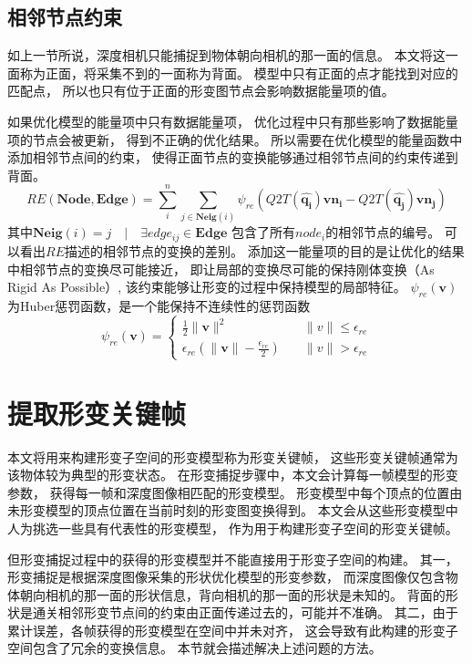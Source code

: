 \subsection{相邻节点约束}
如上一节所说，深度相机只能捕捉到物体朝向相机的那一面的信息。
本文将这一面称为正面，将采集不到的一面称为背面。
模型中只有正面的点才能找到对应的匹配点，
所以也只有位于正面的形变图节点会影响数据能量项的值。

如果优化模型的能量项中只有数据能量项，
优化过程中只有那些影响了数据能量项的节点会被更新，
得到不正确的优化结果。
所以需要在优化模型的能量函数中添加相邻节点间的约束，
使得正面节点的变换能够通过相邻节点间的约束传递到背面。
\begin{equation}
    RE(\bm{Node},\bm{Edge})=
    \sum_{i}^{n}
    \sum_{j \in \bm{Neig}(i)}
    \psi_{re}(
            Q2T(
                \hat{\bm{q_i}}
            )
            \bm{vn_i}
            -
            Q2T(
                \hat{\bm{q_j}}
            )
            \bm{vn_j}
        )
\end{equation}
其中$\bm{Neig}(i)={j \quad | \quad \exists edge_{ij} \in \bm{Edge}}$
包含了所有$node_i$的相邻节点的编号。
可以看出$RE$描述的相邻节点的变换的差别。
添加这一能量项的目的是让优化的结果中相邻节点的变换尽可能接近，
即让局部的变换尽可能的保持刚体变换（As Rigid As Possible）,
该约束能够让形变的过程中保持模型的局部特征。
$\psi_{re}(\bm{v})$为Huber惩罚函数，是一个能保持不连续性的惩罚函数
\begin{equation}
    \psi_{re}(\bm{v}) = 
    \begin{cases}
        \frac{1}{2}\|\bm{v}\|^2
        &\quad \|v\| \leq \epsilon_{re}\\
        \epsilon_{re}(\|\bm{v}\|-\frac{\epsilon_{re}}{2})
        &\quad \|v\| > \epsilon_{re}
    \end{cases}
\end{equation}
\section{提取形变关键帧}
本文将用来构建形变子空间的形变模型称为形变关键帧，
这些形变关键帧通常为该物体较为典型的形变状态。
在形变捕捉步骤中，本文会计算每一帧模型的形变参数，
获得每一帧和深度图像相匹配的形变模型。
形变模型中每个顶点的位置由未形变模型的顶点位置在当前时刻的形变图变换得到。
本文会从这些形变模型中人为挑选一些具有代表性的形变模型，
作为用于构建形变子空间的形变关键帧。

但形变捕捉过程中的获得的形变模型并不能直接用于形变子空间的构建。
其一，形变捕捉是根据深度图像采集的形状优化模型的形变参数，
而深度图像仅包含物体朝向相机的那一面的形状信息，背向相机的那一面的形状是未知的。
背面的形状是通关相邻形变节点间的约束由正面传递过去的，可能并不准确。
其二，由于累计误差，各帧获得的形变模型在空间中并未对齐，
这会导致有此构建的形变子空间包含了冗余的变换信息。
本节就会描述解决上述问题的方法。
